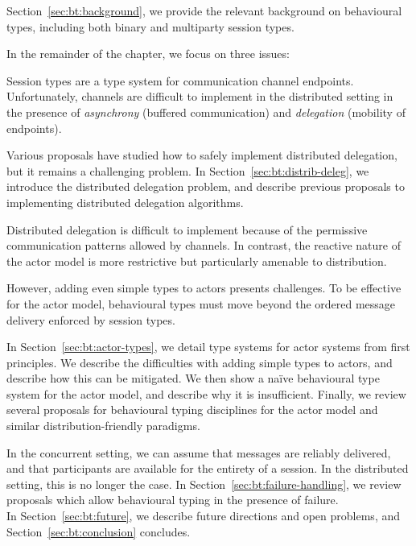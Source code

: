 \documentclass[
graybox,
envcountchap
]{svmult}
\begin{document}
\begin{bibunit}
  Section~\ref{sec:bt:background}, we provide the relevant background on
  behavioural types, including both binary and multiparty session types.

  In the remainder of the chapter, we focus on three issues:

      Session types are a type system for communication channel endpoints.
      Unfortunately, channels are difficult to implement in the distributed
      setting in the presence of \emph{asynchrony} (buffered communication) and
      \emph{delegation} (mobility of endpoints).

      Various proposals have studied how to safely implement distributed
      delegation, but it remains a challenging problem.
      In Section~\ref{sec:bt:distrib-deleg}, we introduce the distributed delegation
      problem, and describe previous proposals to implementing distributed
      delegation algorithms.

      Distributed delegation is difficult to implement because of the permissive
      communication patterns allowed by channels. In contrast, the reactive
      nature of the actor model is more restrictive but particularly amenable
      to distribution.

      However, adding even simple types to actors presents challenges.
      To be effective for the actor model, behavioural types must move beyond
      the ordered message delivery enforced by session types.

      In Section~\ref{sec:bt:actor-types}, we detail type systems for actor
      systems from first principles. We describe the difficulties with adding
      simple types to actors, and describe how this can be mitigated. We then
      show a na\"ive behavioural type system for the actor model, and describe
      why it is insufficient. Finally, we review several proposals for behavioural
      typing disciplines for the actor model and similar distribution-friendly
      paradigms.

      In the concurrent setting, we can assume that messages are reliably
      delivered, and that participants are available for the entirety of a
      session. In the distributed setting, this is no longer the case. In
      Section~\ref{sec:bt:failure-handling}, we review proposals which allow
      behavioural typing in the presence of failure. \\


  In Section~\ref{sec:bt:future}, we describe future directions and open
  problems, and Section~\ref{sec:bt:conclusion} concludes.


\end{bibunit}
\end{document}
